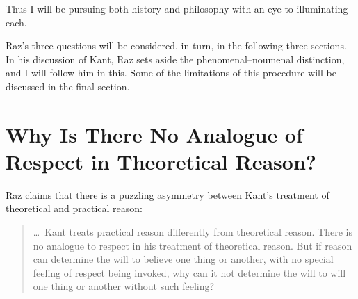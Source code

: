 \documentclass[a4paper,12pt]{article}
\begin{document}
Thus I will be pursuing both history and philosophy with an eye to illuminating each.


Raz's three questions will be considered, in turn, in the following three sections. In his discussion of Kant, Raz sets aside the phenomenal--noumenal distinction, and I will follow him in this. Some of the limitations of this procedure will be discussed in the final section.


\section{Why Is There No Analogue of Respect in Theoretical Reason?} \label{sec:why_is_there_no_analogue_of_respect_in_theoretical_reason} %

Raz claims that there is a puzzling asymmetry between Kant's treatment of theoretical and practical reason: 
\begin{quote}
	\ldots\ Kant treats practical reason differently from theoretical reason. There is no analogue to respect in his treatment of theoretical reason. But if reason can determine the will to believe one thing or another, with no special feeling of respect being invoked, why can it not determine the will to will one thing or another without such feeling? \citep[132--3]{Raz:2001ps} 
\end{quote}
\end{document}
